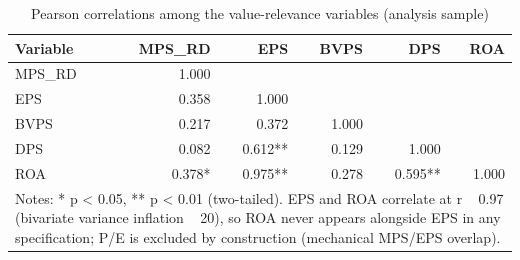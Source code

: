 \begin{table}[htbp]
\centering
\caption{Pearson correlations among the value-relevance variables (analysis sample)}
\label{tab:t2_correlations}
\begin{tabular}{lrrrrr}
\toprule
Variable & MPS\_RD & EPS & BVPS & DPS & ROA \\
\midrule
MPS\_RD & 1.000 &  &  &  &  \\
EPS & 0.358 & 1.000 &  &  &  \\
BVPS & 0.217 & 0.372 & 1.000 &  &  \\
DPS & 0.082 & 0.612** & 0.129 & 1.000 &  \\
ROA & 0.378* & 0.975** & 0.278 & 0.595** & 1.000 \\
\midrule
\multicolumn{6}{l}{\footnotesize Notes: * p < 0.05, ** p < 0.01 (two-tailed). EPS and ROA correlate at r ~ 0.97 (bivariate variance inflation ~ 20), so ROA never appears alongside EPS in any specification; P/E is excluded by construction (mechanical MPS/EPS overlap).} \\
\bottomrule
\end{tabular}
\end{table}

